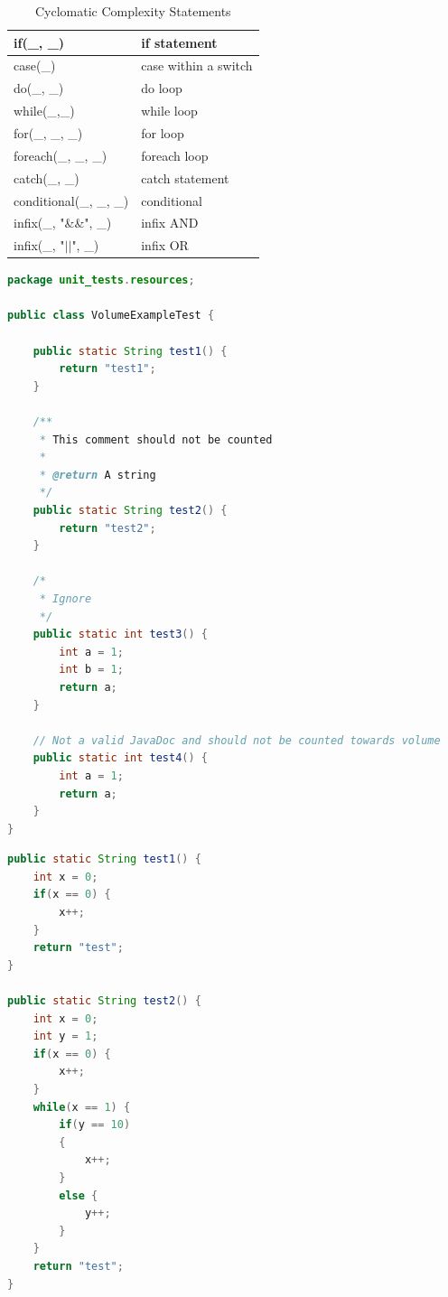 \documentclass{article}
\begin{document}
\begin{table}[h!tbp]
	\caption{Cyclomatic Complexity Statements}
	\label{complexityvalues}
	\begin{tabular}{l|l}	
		\hline
		if(\_, \_)					&			if statement \\
		\hline
		case(\_)					&			case within a switch \\
		\hline
		do(\_, \_)					&			do loop \\
		\hline
		while(\_,\_)				&			while loop \\
		\hline
		for(\_, \_, \_)				&			for loop \\
		\hline
		foreach(\_, \_, \_)			&			foreach loop \\
		\hline
		catch(\_, \_)				&			catch statement \\
		\hline
		conditional(\_, \_, \_)		&			conditional \\
		\hline
		infix(\_, "\&\&", \_)		&			infix AND \\
		\hline
		infix(\_, "\(||\)", \_)		&			infix OR \\
		\hline
	\end{tabular}
\end{table}

\begin{lstlisting}[language={Java}, caption={Lines of Code Example}, label={ex:loc}]
package unit_tests.resources;

public class VolumeExampleTest {
	
	public static String test1() {
		return "test1";
	}
	
	/**
	 * This comment should not be counted
	 * 
	 * @return A string
	 */
	public static String test2() {
		return "test2";
	}
	
	/*
	 * Ignore
	 */
	public static int test3() {
		int a = 1;
		int b = 1;
		return a;
	}
	
	// Not a valid JavaDoc and should not be counted towards volume
	public static int test4() {
		int a = 1;
		return a;
	}
}
\end{lstlisting}


\begin{lstlisting}[language={Java}, caption={Unit Complexity Tests}, label={ex:unit-complexity}]
public static String test1() {
	int x = 0;
	if(x == 0) {
		x++;
	}
	return "test";
}

public static String test2() {
	int x = 0;
	int y = 1;
	if(x == 0) {
		x++;
	}
	while(x == 1) {
		if(y == 10)
		{
			x++;
		}
		else {
			y++;
		}
	}
	return "test";
}
\end{lstlisting}
\end{document}
